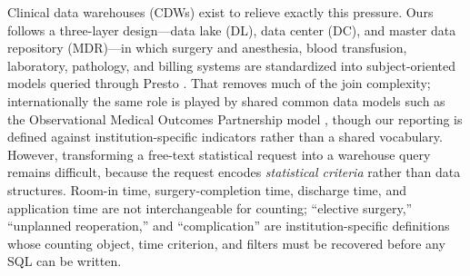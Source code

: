 \documentclass[applsci,article,submit,pdftex,oneauthor]{Definitions/mdpi}
\begin{document}
Clinical data warehouses (CDWs) exist to relieve exactly this pressure. Ours follows a three-layer design---data lake (DL), data center (DC), and master data repository (MDR)---in which surgery and anesthesia, blood transfusion, laboratory, pathology, and billing systems are standardized into subject-oriented models queried through Presto \cite{presto2019}. That removes much of the join complexity; internationally the same role is played by shared common data models such as the Observational Medical Outcomes Partnership model \cite{ohdsi2015}, though our reporting is defined against institution-specific indicators rather than a shared vocabulary. However, transforming a free-text
statistical request into a warehouse query remains difficult, because the
request encodes \emph{statistical criteria} rather than data structures. Room-in
time, surgery-completion time, discharge time, and application time are not
interchangeable for counting; ``elective surgery,'' ``unplanned reoperation,''
and ``complication'' are institution-specific definitions whose counting object,
time criterion, and filters must be recovered before any SQL can be written.
\end{document}
